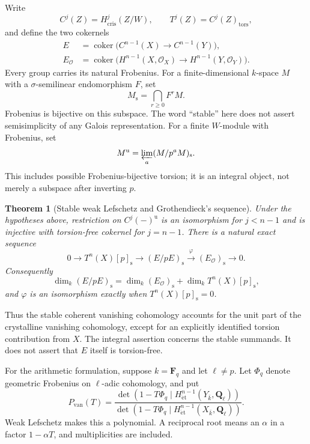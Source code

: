 \documentclass[11pt]{article}
\newtheorem{theorem}{Theorem}[section]
\theoremstyle{remark}\newtheorem{remark}[theorem]{Remark}
\newcommand{\OO}{\mathcal O}
\newcommand{\cris}{\mathrm{cris}}
\newcommand{\et}{\mathrm{\acute et}}
\newcommand{\st}{\mathrm{s}}
\newcommand{\uF}{\mathrm{u}}
\newcommand{\coker}{\operatorname{coker}}
\begin{document}
Write
\[
 C^j(Z)=H^j_{\cris}(Z/W),\qquad
 T^j(Z)=C^j(Z)_{\mathrm{tors}},
\]
and define the two cokernels
\begin{align*}
 E&=\coker\bigl(C^{n-1}(X)\longrightarrow C^{n-1}(Y)\bigr),\\
 E_{\OO}&=\coker\bigl(H^{n-1}(X,\OO_X)
                  \longrightarrow H^{n-1}(Y,\OO_Y)\bigr).
\end{align*}
Every group carries its natural Frobenius. For a finite-dimensional $k$-space $M$ with a $\sigma$-semilinear endomorphism $F$, set
\[
 M_{\st}=\bigcap_{r\geq0}F^rM.
\]
Frobenius is bijective on this subspace. The word ``stable'' here does not assert semisimplicity of any Galois representation. For a finite $W$-module with Frobenius, set
\[
 M^{\uF}=\varprojlim_a(M/p^aM)_{\st}.
\]
This includes possible Frobenius-bijective torsion; it is an integral object, not merely a subspace after inverting $p$.

\begin{theorem}[Stable weak Lefschetz and Grothendieck's sequence]
\label{thm:exact}
Under the hypotheses above, restriction on $C^j(-)^{\uF}$ is an isomorphism for $j<n-1$ and is injective with torsion-free cokernel for $j=n-1$. There is a natural exact sequence
\begin{equation}\label{eq:main}
 0\longrightarrow T^n(X)[p]_{\st}
 \longrightarrow(E/pE)_{\st}
 \xrightarrow{\varphi}(E_{\OO})_{\st}
 \longrightarrow0.
\end{equation}
Consequently
\[
 \dim_k(E/pE)_{\st}
 =\dim_k(E_{\OO})_{\st}+\dim_k T^n(X)[p]_{\st},
\]
and $\varphi$ is an isomorphism exactly when $T^n(X)[p]_{\st}=0$.
\end{theorem}

Thus the stable coherent vanishing cohomology accounts for the unit part of the crystalline vanishing cohomology, except for an explicitly identified torsion contribution from $X$. The integral assertion concerns the stable summands. It does not assert that $E$ itself is torsion-free.

For the arithmetic formulation, suppose $k=\mathbf F_q$ and let $\ell\ne p$. Let $\Phi_q$ denote geometric Frobenius on $\ell$-adic cohomology, and put
\begin{equation}\label{eq:polynomial}
 P_{\mathrm{van}}(T)=
 \frac{\det(1-T\Phi_q\mid H^{n-1}_{\et}(Y_{\bar k},\mathbf Q_\ell))}
 {\det(1-T\Phi_q\mid H^{n-1}_{\et}(X_{\bar k},\mathbf Q_\ell))}.
\end{equation}
Weak Lefschetz makes this a polynomial. A reciprocal root means an $\alpha$ in a factor $1-\alpha T$, and multiplicities are included.
\end{document}
